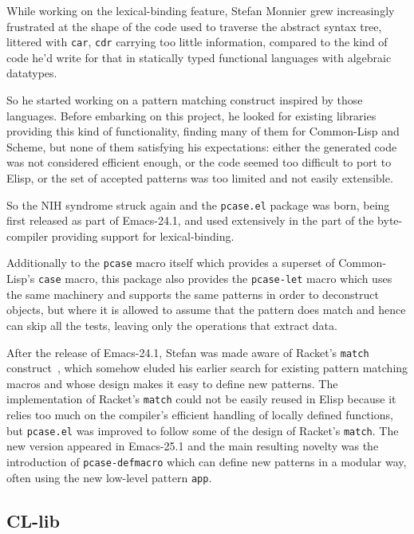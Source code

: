 \documentclass[format=acmsmall, review=false, screen=true]{acmart}
\newcommand \Elisp {Elisp}
\begin{document}
While working on the lexical-binding feature, Stefan Monnier grew
increasingly frustrated at the shape of the code used to traverse the
abstract syntax tree, littered with \texttt{car}, \texttt{cdr} carrying too
little information, compared to the kind of code he'd write for that in
statically typed functional languages with algebraic datatypes.

So he started working on a pattern matching construct inspired by those
languages.  Before embarking on this project, he looked for existing
libraries providing this kind of functionality, finding many of them for
Common-Lisp and Scheme, but none of them satisfying his expectations: either
the generated code was not considered efficient enough, or the code seemed
too difficult to port to \Elisp{}, or the set of accepted patterns was too
limited and not easily extensible.

So the NIH syndrome struck again and the \texttt{pcase.el} package was born,
being first released as part of Emacs-24.1, and used extensively in the part
of the byte-compiler providing support for lexical-binding.

Additionally to the \texttt{pcase} macro itself which provides a superset of
Common-Lisp's \texttt{case} macro, this package also provides the
\texttt{pcase-let} macro which uses the same machinery and supports the same
patterns in order to deconstruct objects, but where it is allowed to assume
that the pattern does match and hence can skip all the tests, leaving only the
operations that extract data.

After the release of Emacs-24.1, Stefan was made aware of Racket's
\texttt{match} construct~\cite{RacketReference2018}, which somehow eluded
his earlier search for
existing pattern matching macros and whose design makes it easy to define
new patterns.  The implementation of Racket's \texttt{match} could not be
easily reused in \Elisp{} because it relies too much on the compiler's
efficient handling of locally defined functions, but \texttt{pcase.el} was
improved to follow some of the design of Racket's \texttt{match}.
The new version appeared in Emacs-25.1 and the main resulting novelty was the
introduction of \texttt{pcase-defmacro} which can define new patterns
in a modular way, often using the new low-level pattern \texttt{app}.

\subsection{CL-lib}          %
\end{document}
